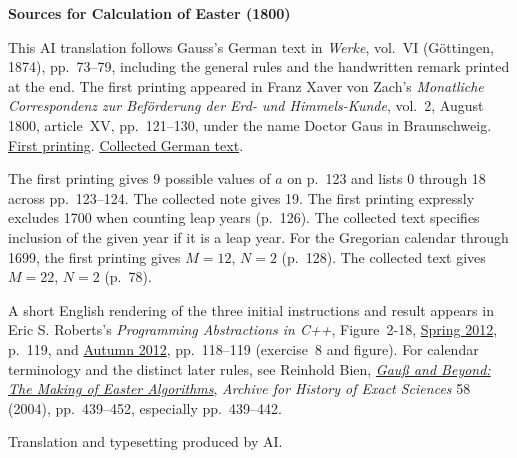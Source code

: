 \clearpage\thispagestyle{empty}
\begin{center}\textbf{Sources for Calculation of Easter (1800)}\end{center}
\noindent This AI translation follows Gauss’s German text in \textit{Werke}, vol.~VI (Göttingen, 1874), pp.~73--79, including the general rules and the handwritten remark printed at the end. The first printing appeared in Franz Xaver von Zach’s \textit{Monatliche Correspondenz zur Beförderung der Erd- und Himmels-Kunde}, vol.~2, August 1800, article~XV, pp.~121--130, under the name Doctor Gaus in Braunschweig. \href{https://www.digitale-sammlungen.de/de/view/bsb10538594?page=127}{First printing}. \href{https://gdz.sub.uni-goettingen.de/id/PPN236007467}{Collected German text}.
\par\smallskip\noindent The first printing gives 9 possible values of $a$ on p.~123 and lists 0 through 18 across pp.~123--124. The collected note gives 19. The first printing expressly excludes 1700 when counting leap years (p.~126). The collected text specifies inclusion of the given year if it is a leap year. For the Gregorian calendar through 1699, the first printing gives $M=12$, $N=2$ (p.~128). The collected text gives $M=22$, $N=2$ (p.~78).
\par\smallskip\noindent A short English rendering of the three initial instructions and result appears in Eric S. Roberts’s \textit{Programming Abstractions in C++}, Figure~2-18, \href{https://tfetimes.com/wp-content/uploads/2015/04/Prog-in-Cpp.pdf}{Spring 2012}, p.~119, and \href{https://web.stanford.edu/dept/cs_edu/resources/textbook/Reader-Beta-2012.pdf}{Autumn 2012}, pp.~118--119 (exercise~8 and figure). For calendar terminology and the distinct later rules, see Reinhold Bien, \href{https://doi.org/10.1007/s00407-004-0078-5}{\textit{Gauß and Beyond: The Making of Easter Algorithms}}, \textit{Archive for History of Exact Sciences} 58 (2004), pp.~439--452, especially pp.~439--442.
\par\smallskip\noindent Translation and typesetting produced by AI.
\clearpage
